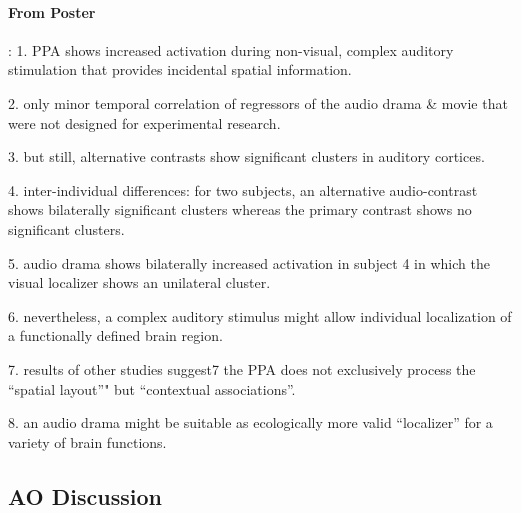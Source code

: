 \documentclass[english]{article}
\begin{document}




\paragraph{From Poster}: 1. PPA shows increased activation during non-visual,
complex auditory stimulation that provides incidental spatial information.

2. only minor temporal correlation of regressors of the audio drama \& movie that were not designed for experimental research.

3. but still, alternative contrasts show significant clusters in auditory
cortices.

4. inter-individual differences: for two subjects, an alternative audio-contrast
shows bilaterally significant clusters whereas the primary contrast shows no
significant clusters.

5. audio drama shows bilaterally increased activation in subject 4 in which the
visual localizer shows an unilateral cluster.

6. nevertheless, a  complex auditory stimulus might allow individual
localization of a functionally defined brain region.

7. results of other studies suggest7 the PPA does not exclusively process the
``spatial layout''" but ``contextual associations''.

8. an audio drama might be suitable as ecologically more valid ``localizer'' for
a variety of brain functions.


\subsection{AO Discussion}
\end{document}
